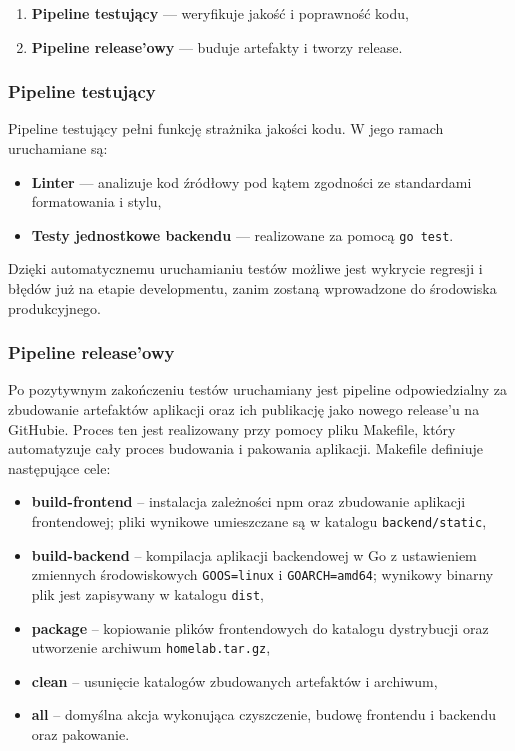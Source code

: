 \begin{enumerate}
    \item \textbf{Pipeline testujący} — weryfikuje jakość i poprawność kodu,
    \item \textbf{Pipeline release’owy} — buduje artefakty i tworzy release.
\end{enumerate}

\subsubsection{Pipeline testujący}

Pipeline testujący pełni funkcję strażnika jakości kodu. W jego ramach uruchamiane są:

\begin{itemize}
    \item \textbf{Linter} — analizuje kod źródłowy pod kątem zgodności ze standardami formatowania i stylu,
    \item \textbf{Testy jednostkowe backendu} — realizowane za pomocą \texttt{go test}.
\end{itemize}

Dzięki automatycznemu uruchamianiu testów możliwe jest wykrycie regresji i błędów już na etapie developmentu, zanim zostaną wprowadzone do środowiska produkcyjnego.

\subsubsection{Pipeline release’owy}

Po pozytywnym zakończeniu testów uruchamiany jest pipeline odpowiedzialny za zbudowanie artefaktów aplikacji oraz ich publikację jako nowego release'u na GitHubie. Proces ten jest realizowany przy pomocy pliku Makefile, który automatyzuje cały proces budowania i pakowania aplikacji. Makefile definiuje następujące cele:

\begin{itemize}
    \item \textbf{build-frontend} – instalacja zależności npm oraz zbudowanie aplikacji frontendowej; pliki wynikowe umieszczane są w katalogu \texttt{backend/static},
    \item \textbf{build-backend} – kompilacja aplikacji backendowej w Go z ustawieniem zmiennych środowiskowych \texttt{GOOS=linux} i \texttt{GOARCH=amd64}; wynikowy binarny plik jest zapisywany w katalogu \texttt{dist},
    \item \textbf{package} – kopiowanie plików frontendowych do katalogu dystrybucji oraz utworzenie archiwum \texttt{homelab.tar.gz},
    \item \textbf{clean} – usunięcie katalogów zbudowanych artefaktów i archiwum,
    \item \textbf{all} – domyślna akcja wykonująca czyszczenie, budowę frontendu i backendu oraz pakowanie.
\end{itemize}


